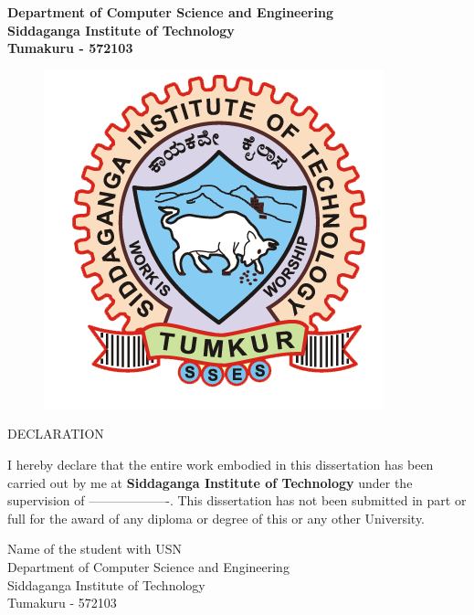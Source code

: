 \begin{center}
\bfseries
\large{Department of Computer Science and Engineering\\
Siddaganga Institute of Technology \\
Tumakuru - 572103} \\
\begin{figure}[hbtp]
\centering
\includegraphics[scale=1]{../ThesisFigs/College_logo.png}
\end{figure}
\LARGE{DECLARATION} \\
\end{center}
\vspace{0.5in}
\normalsize{
I hereby declare that the entire work embodied in this dissertation has been carried out by me at \textbf{Siddaganga Institute of Technology} under the supervision of -------------------. This dissertation has not been submitted in part or full for the award of any diploma or degree of this or any other University.} \\
\vspace{0.5in}
\begin{flushleft}
\normalsize{Name of the student with USN} \\
Department of Computer Science and Engineering\\
Siddaganga Institute of Technology\\
Tumakuru - 572103\\
\end{flushleft}


